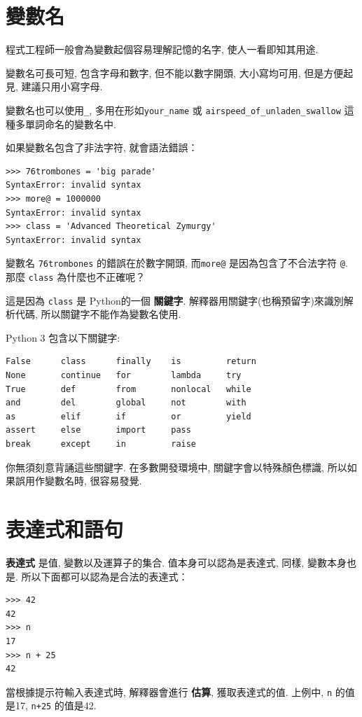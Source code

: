 \documentclass[10pt]{book}
\begin{document}
\section{變數名}

程式工程師一般會為變數起個容易理解記憶的名字, 使人一看即知其用途. 

變數名可長可短, 包含字母和數字, 但不能以數字開頭, 
大小寫均可用, 但是方便起見, 建議只用小寫字母. 

變數名也可以使用\verb"_",  多用在形如\verb"your_name" 或 
\verb"airspeed_of_unladen_swallow" 這種多單詞命名的變數名中. 

如果變數名包含了非法字符, 就會語法錯誤：

\begin{verbatim}
>>> 76trombones = 'big parade'
SyntaxError: invalid syntax
>>> more@ = 1000000
SyntaxError: invalid syntax
>>> class = 'Advanced Theoretical Zymurgy'
SyntaxError: invalid syntax
\end{verbatim}
%
變數名 {\tt 76trombones}  的錯誤在於數字開頭, 
而{\tt more@} 是因為包含了不合法字符 {\tt @}. 
那麼 {\tt class} 為什麼也不正確呢？

這是因為 {\tt class} 是 Python的一個 {\bf 關鍵字}. 
解釋器用關鍵字(也稱預留字)來識別解析代碼, 所以關鍵字不能作為變數名使用. 

Python 3 包含以下關鍵字:

\begin{verbatim}
False      class      finally    is         return
None       continue   for        lambda     try
True       def        from       nonlocal   while
and        del        global     not        with
as         elif       if         or         yield
assert     else       import     pass
break      except     in         raise
\end{verbatim}
%

你無須刻意背誦這些關鍵字. 在多數開發環境中, 關鍵字會以特殊顏色標識, 
所以如果誤用作變數名時, 很容易發覺. 

\section{表達式和語句}

{\bf 表達式} 是值, 變數以及運算子的集合. 
值本身可以認為是表達式, 同樣, 變數本身也是. 
所以下面都可以認為是合法的表達式：

\begin{verbatim}
>>> 42
42
>>> n
17
>>> n + 25
42
\end{verbatim}
%
當根據提示符輸入表達式時, 解釋器會進行 {\bf 估算}, 獲取表達式的值. 
上例中, {\tt n} 的值是17, {\tt n+25} 的值是42. 
\end{document}
